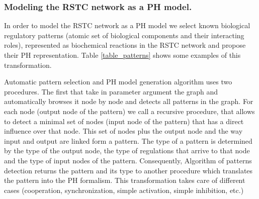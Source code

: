 \subsubsection{Modeling the RSTC network as a PH model.}



In order to model the RSTC network as a PH model we select known biological regulatory patterns (atomic set of biological components and their interacting roles), represented 
as biochemical reactions in the RSTC network and propose their PH representation. Table \ref{table_patterns} shows some examples of this transformation. 

Automatic pattern selection and PH model generation algorithm uses two procedures. The first that take in parameter argument the graph and  automatically browses it node by node and detects all patterns in the graph. For each node (output node of the pattern) we  call a recursive procedure,
that  allows  to detect a minimal set of nodes (input node of the pattern) that has a direct influence over that node. This set of nodes plus the output node and the way  input and output are linked form a pattern. 
The type of a pattern is determined by the type of the output node, the type of regulations that arrive to that node and the type of input nodes of the pattern. Consequently, Algorithm of patterns detection returns the pattern 
and its type to another procedure  which  translates the pattern into the PH formalism. This transformation  takes care of different cases (cooperation, synchronization, simple activation, simple inhibition, etc.)




